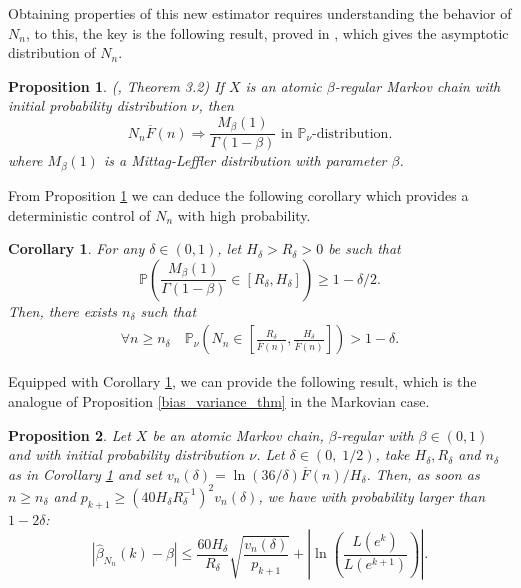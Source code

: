 \documentclass[sn-mathphys-ay]{sn-jnl}%
\newtheorem{proposition}{Proposition}[section]%
\newtheorem{corollary}{Corollary}[section]
\renewcommand{\P}{\mathbb{P}}
\begin{document}
Obtaining properties of this new estimator requires understanding the behavior of
\(N_n\), to this, the key is the following result, proved in \cite{Tjostheim-2001}, which gives
the asymptotic distribution of \(N_n\).

\begin{proposition}\label{prop:markov:limit_dist}(\cite{Tjostheim-2001}, Theorem 3.2) If \(X\) is an atomic \(\beta\)-regular
    Markov chain with initial probability distribution \(\nu\), then
    \begin{equation*}
        N_n \overline{F}(n) \Rightarrow \frac{M_{\beta}(1)}{\Gamma(1-\beta)} \text{ in } \P_{\nu}\text{-distribution}.
    \end{equation*}
    where \(M_{\beta}(1)\) is a Mittag-Leffler distribution with parameter \(\beta\).
\end{proposition}

From Proposition \ref{prop:markov:limit_dist} we can deduce the following corollary which
provides a deterministic control of \(N_n\) with high probability.

\begin{corollary}\label{cor:markov:deterministic_control} For any \(\delta \in (0,1)\), let \(H_\delta> R_\delta>0\) be such that
    \begin{equation*}
        \P \left(\frac{M_\beta(1)}{\Gamma(1-\beta)}\in \left[R_\delta, H_\delta\right]\right)\geq 1-\delta/2.
    \end{equation*}
    Then, there exists \(n_\delta\)
    such that
    \begin{align*}
        \forall n\geq n_\delta\quad\P_{\nu}\left( N_n\in \left[ \frac{R_{\delta}}{\overline{F}(n)}, \frac{H_{\delta}}{\overline{F}(n)} \right] \right)>1-\delta.
    \end{align*}
\end{corollary}

Equipped with Corollary \ref{cor:markov:deterministic_control}, we can provide the following result,
which is the analogue of Proposition \ref{bias_variance_thm} in the Markovian case.

\begin{proposition}\label{prop:markov:bias_variance_thm}
    Let \(X\) be an atomic Markov chain, \(\beta\)-regular with \(\beta\in(0,1)\) and with initial probability
    distribution \(\nu\). Let \(\delta\in (0,\; 1/2)\), take \(H_\delta, R_{\delta}\) and \(n_\delta\)
    as in Corollary \ref{cor:markov:deterministic_control} and set \(v_n( \delta) = \ln ( {36/\delta})\overline{F}(n)/H_{\delta}\).
    Then, as soon as \(n\geq n_\delta\) and \(p_{k+1}\geq {({40H_\delta}R^{-1}_\delta)}^2 v_n(\delta)\), we have with probability larger than $1-2\delta$:
    \begin{equation*}
        \left|\widehat{\beta}_{N_n}(k)-\beta\right|\leq \frac{60 H_\delta}{R_{\delta}}\sqrt{\frac{v_n(\delta)}{p_{k+1}}} + \left| \ln\left(\frac{L(e^{k})}{L(e^{k+1})}\right) \right|.
    \end{equation*}
\end{proposition}
\end{document}

